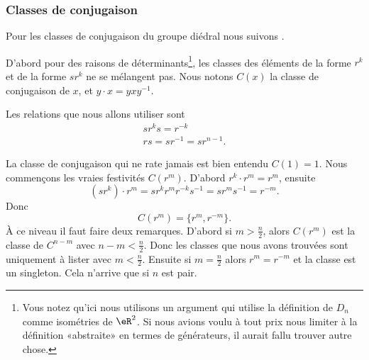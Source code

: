 \subsubsection{Classes de conjugaison}
\label{subsubsecZQnBcgo}

Pour les classes de conjugaison du groupe diédral nous suivons \cite{HRIMAJJ}.

D'abord pour des raisons de déterminants\footnote{Vous notez qu'ici nous utilisons un argument qui utilise la définition de \( D_n\) comme isométries de \( \eR^2\). Si nous avions voulu à tout prix nous limiter à la définition «abstraite» en termes de générateurs, il aurait fallu trouver autre chose.}, les classes des éléments de la forme \( r^k\) et de la forme \( sr^k\) ne se mélangent pas. Nous notons \( C(x)\) la classe de conjugaison de \( x\), et \( y\cdot x=yxy^{-1}\).

Les relations que nous allons utiliser sont 
\begin{subequations}
    \begin{align}
        sr^ks=r^{-k}\\
        rs=sr^{-1}=sr^{n-1}.
    \end{align}
\end{subequations}

La classe de conjugaison qui ne rate jamais est bien entendu \( C(1)={1}\). Nous commençons les vraies festivités \( C(r^{m})\). D'abord \( r^k\cdot r^m=r^m\), ensuite
\begin{equation}
    (sr^k)\cdot r^m=sr^kr^mr^{-k}s^{-1}=sr^ms^{-1}=r^{-m}.
\end{equation}
Donc
\begin{equation}    \label{EqVFfFxgi}
    C(r^m)=\{ r^m,r^{-m} \}.
\end{equation}
À ce niveau il faut faire deux remarques. D'abord si \( m>\frac{ n }{2}\), alors \( C(r^m)\) est la classe de \( C^{n-m}\) avec \( n-m<\frac{ n }{2}\). Donc les classes que nous avons trouvées sont uniquement à lister avec \( m<\frac{ n }{2}\). Ensuite si \( m=\frac{ n }{2}\) alors \( r^m=r^{-m}\) et la classe est un singleton. Cela n'arrive que si \( n\) est pair.

